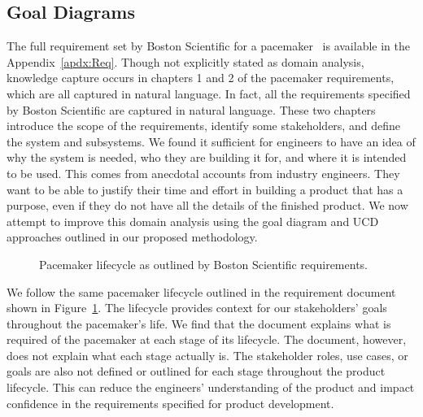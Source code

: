 
\subsection{Goal Diagrams}

The full requirement set by Boston Scientific for a pacemaker~\cite{scientific2007pacemaker} is available in the Appendix~\ref{apdx:Req}. Though not explicitly stated as domain analysis, knowledge capture occurs in chapters 1 and 2 of the pacemaker requirements, which are all captured in natural language. In fact, all the requirements specified by Boston Scientific are captured in natural language. These two chapters introduce the scope of the requirements, identify some stakeholders, and define the system and subsystems. We found it sufficient for engineers to have an idea of why the system is needed, who they are building it for, and where it is intended to be used. This comes from anecdotal accounts from industry engineers. They want to be able to justify their time and effort in building a product that has a purpose, even if they do not have all the details of the finished product. We now attempt to improve this domain analysis using the goal diagram and \gls{UCD} approaches outlined in our proposed methodology.


\begin{figure}
	\centering
	
	\caption{Pacemaker lifecycle as outlined by Boston Scientific requirements.}
	\label{fig:Pacemaker_lifecycle}
\end{figure}

We follow the same pacemaker lifecycle outlined in the requirement document shown in Figure~\ref{fig:Pacemaker_lifecycle}. The lifecycle provides context for our stakeholders' goals throughout the pacemaker's life. We find that the document explains what is required of the pacemaker at each stage of its lifecycle. The document, however, does not explain what each stage actually is. The stakeholder roles, use cases, or goals are also not defined or outlined for each stage throughout the product lifecycle. This can reduce the engineers' understanding of the product and impact confidence in the requirements specified for product development.

